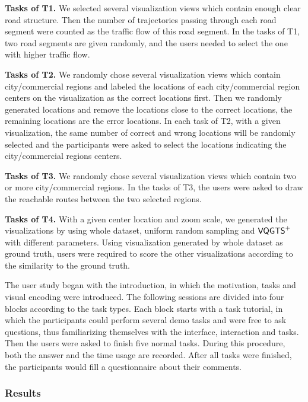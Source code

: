 \textbf{Tasks of T1.} We selected several visualization views which contain enough clear road structure. Then the number of trajectories passing through each road segment were counted as the traffic flow of this road segment. In the tasks of T1, two road segments are given randomly, and the users needed to select the one with higher traffic flow.  

\textbf{Tasks of T2.} We randomly chose several visualization views which contain city/commercial regions and labeled the locations of each city/commercial region centers on the visualization as the correct locations first.  Then we randomly generated locations and remove the locations close to the correct locations, the remaining locations are the error locations. In each task of T2, with a given visualization, the same number of correct and wrong locations will be randomly selected and the participants were asked to select the locations indicating the city/commercial regions centers. 

\textbf{Tasks of T3.} We randomly chose several visualization views which contain two or more city/commercial regions. In the tasks of T3, the users were asked to draw the reachable routes between the two selected regions. 

\textbf{Tasks of T4.} With a given center location and zoom scale, we generated the visualizations by using whole dataset, uniform random sampling and $\mathsf{VQGTS}^{+}$ with different parameters. Using visualization generated by whole dataset as ground truth, users were required to score the other visualizations according to the similarity to the ground truth.  

The user study began with the introduction, in which the motivation, tasks and visual encoding were introduced. The following sessions are divided into four blocks according to the task types. Each block starts with a task tutorial, in which the participants could perform several demo tasks and were free to ask questions, thus familiarizing themselves with the interface, interaction and tasks.
Then the users were asked to finish five normal tasks. During this procedure, both the answer and the time usage are recorded.
After all tasks were finished, the participants would fill a questionnaire about their comments. 

\subsubsection{Results}



